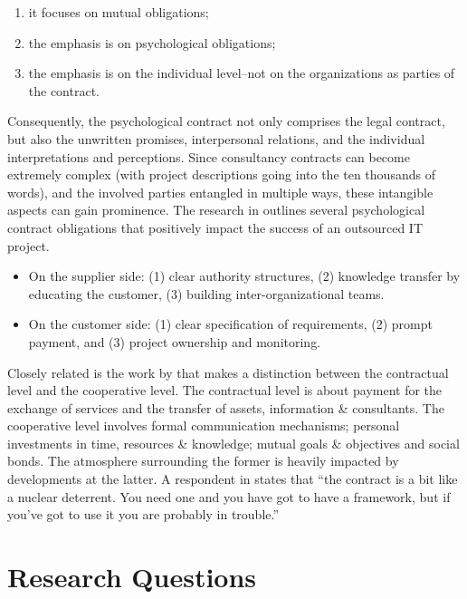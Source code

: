 \documentclass[12pt]{article}
\providecommand{\tightlist}{%
  \setlength{\itemsep}{0pt}\setlength{\parskip}{0pt}}
\begin{document}
\begin{enumerate}
\def\labelenumi{\arabic{enumi}.}
\tightlist
\item
  it focuses on mutual obligations;
\item
  the emphasis is on psychological obligations;
\item
  the emphasis is on the individual level--not on the organizations as
  parties of the contract.
\end{enumerate}

Consequently, the psychological contract not only comprises the legal
contract, but also the unwritten promises, interpersonal relations, and
the individual interpretations and perceptions. Since consultancy
contracts can become extremely complex (with project descriptions going
into the ten thousands of words), and the involved parties entangled in
multiple ways, these intangible aspects can gain prominence. The
research in \citet[369-70]{ang2004} outlines several psychological
contract obligations that positively impact the success of an outsourced
IT project.

\begin{itemize}
\tightlist
\item
  On the supplier side: (1) clear authority structures, (2) knowledge
  transfer by educating the customer, (3) building inter-organizational
  teams.
\item
  On the customer side: (1) clear specification of requirements, (2)
  prompt payment, and (3) project ownership and monitoring.
\end{itemize}

Closely related is the work by \citet[9-13]{willcockskern} that makes a
distinction between the contractual level and the cooperative level. The
contractual level is about payment for the exchange of services and the
transfer of assets, information \& consultants. The cooperative level
involves formal communication mechanisms; personal investments in time,
resources \& knowledge; mutual goals \& objectives and social bonds. The
atmosphere surrounding the former is heavily impacted by developments at
the latter. A respondent in \citet[9]{willcockskern} states that ``the
contract is a bit like a nuclear deterrent. You need one and you have
got to have a framework, but if you've got to use it you are probably in
trouble.''

\hypertarget{research-questions}{%
\section{Research Questions}\label{research-questions}}
\end{document}
